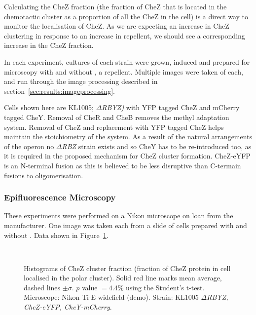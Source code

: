 \documentclass[../main.tex]{subfiles}
\begin{document}
Calculating the CheZ fraction (the fraction of CheZ that is located in the chemotactic cluster as a proportion of all the CheZ in the cell) is a direct way to monitor the localisation of CheZ. As we are expecting an increase in CheZ clustering in response to an increase in repellent, we should see a corresponding increase in the CheZ fraction.

In each experiment, cultures of each strain were grown, induced and prepared for microscopy with and without , a repellent. Multiple images were taken of each, and run through the image processing described in section~\ref{sec:results:imageprocessing}.

Cells shown here are KL1005; \textsl{\(\Delta\)RBYZ)} with YFP tagged CheZ and mCherry tagged CheY. Removal of CheR and CheB removes the methyl adaptation system. Removal of CheZ and replacement with YFP tagged CheZ helps maintain the stoichiometry of the system. As a result of the natural arrangements of the operon no \textsl{\(\Delta\)RBZ} strain exists and so CheY has to be re-introduced too, as it is required in the proposed mechanism for CheZ cluster formation. CheZ-eYFP is an N-terminal fusion as this is believed to be less disruptive than C-termain fusions to oligomerisation.

\subsubsection{Epifluorescence Microscopy}
\label{sec:results:cs:epi}

These experiments were performed on a Nikon microscope on loan from the manufacturer. One image was taken each from a slide of cells prepared with and without . Data shown in Figure~\ref{fig:results:nikon}.

\begin{figure}
\begin{center}
\\
\caption[Image processing results on Nikon microscope]{Histograms of CheZ cluster fraction (fraction of CheZ protein in cell localised in the polar cluster). Solid red line marks mean average, dashed lines \(\pm\sigma\). \(p\) value \(=4.4\%\) using the Student's t-test. Microscope: Nikon Ti-E widefield (demo). Strain: KL1005 \textsl{\(\Delta\)RBYZ, CheZ-eYFP, CheY-mCherry}.}
\label{fig:results:nikon}
\end{center}
\end{figure}
\end{document}
